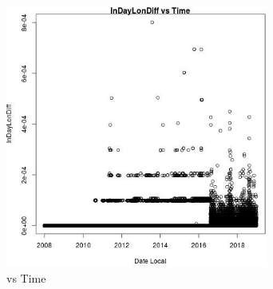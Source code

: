 \begin{figure} 
\centering  
\includegraphics[width=0.77\textwidth]{Code_Outputs/Report_PM25_Step4_part_e_de_duplicated_aves_ML_input_InDayLonDiffvDate_Local.jpg} 
\caption{\label{fig:Report_PM25_Step4_part_e_de_duplicated_aves_ML_inputInDayLonDiffvDate_Local}vs Time} 
\end{figure} 
 

